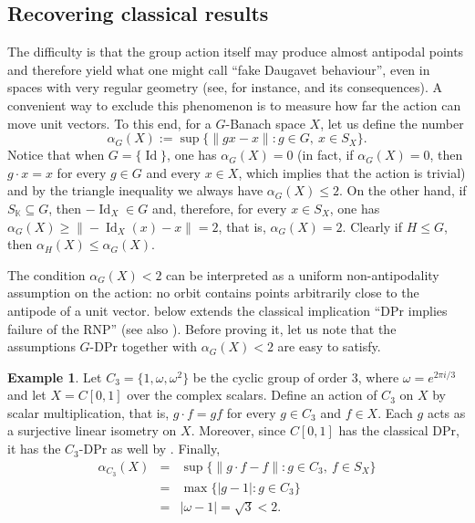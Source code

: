 \documentclass[a4paper,12pt]{amsart}
\theoremstyle{definition}
\theoremstyle{definition}
\newtheorem{example}[theorem]{Example}
\theoremstyle{remark}
\numberwithin{equation}{section}
\newcommand{\K}{\mathbb{K}}
\DeclareMathOperator{\id}{Id}
\renewcommand{\geq}{\geqslant}
\renewcommand{\leq}{\leqslant}
\newcommand{\<}{\langle}
\renewcommand{\>}{\rangle}
\begin{document}
	
	
	\subsection{Recovering classical results} The difficulty is that the group action itself may produce almost antipodal points and therefore yield what one might call ``fake Daugavet behaviour'', even in spaces with very regular geometry (see, for instance,  and its consequences). A convenient way to exclude this phenomenon is to measure how far the action can move unit vectors. To this end, for a $G$-Banach space $X$, let us define the number
	\begin{equation*}
		\alpha_G(X) := \sup \{ \|gx-x\| : g \in G,\ x \in S_X \}.
	\end{equation*}
	Notice that when $G=\{\id\}$, one has $\alpha_G(X)=0$ (in fact, if $\alpha_G(X) = 0$, then $g \cdot x = x$ for every $g \in G$ and every $x \in X$, which implies that the action is trivial) and by the triangle inequality we always have $\alpha_G(X) \leq 2$. On the other hand, if $S_{\K} \subseteq G$, then $-\id_X \in G$ and, therefore, for every $x \in S_X$, one has $\alpha_G(X) \geq \|-\id_X(x)-x\|=2$, that is, $\alpha_G(X) = 2$. Clearly if $H \leq G$, then $\alpha_H(X) \leq \alpha_G(X)$.
	
	
	
	
	
	
	
	The condition $\alpha_G(X)<2$ can be interpreted as a uniform non-antipodality assumption on the action: no orbit contains points arbitrarily close to the antipode of a unit vector.  below extends the classical implication ``DPr implies failure of the RNP'' (see also ). Before proving it, let us note that the assumptions $G$-DPr together with $\alpha_G(X)<2$ are easy to satisfy.
	
	\begin{example} \label{example:C3}
		Let $C_3=\{1,\omega,\omega^2\}$ be the cyclic group of order $3$, where $\omega=e^{2\pi i/3}$ and let $X=C[0,1]$ over the complex scalars. Define an action of $C_3$ on $X$ by scalar multiplication, that is, $g\cdot f = gf$ for every $g\in C_3$ and $f\in X$. Each $g$ acts as a surjective linear isometry on $X$. Moreover, since $C[0,1]$ has the classical DPr, it has the $C_3$-DPr as well by . Finally,
		\begin{eqnarray*}
			\alpha_{C_3}(X)
			&=& \sup \{ \|g\cdot f-f\| : g\in C_3,\ f\in S_X \} \\
			&=& \max \{|g-1|: g\in C_3 \} \\
			&=& |\omega-1|
			= \sqrt{3}
			< 2.
		\end{eqnarray*}
	\end{example}
	
\end{document}
